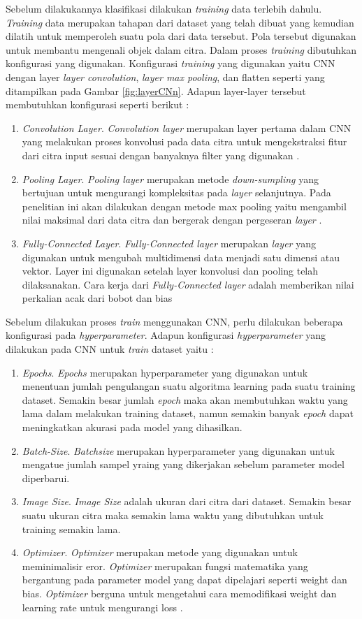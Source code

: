 Sebelum dilakukannya klasifikasi dilakukan \emph{training} data terlebih dahulu. \emph{Training} data merupakan tahapan dari dataset yang telah dibuat yang kemudian dilatih untuk memperoleh suatu pola dari data tersebut. Pola tersebut digunakan untuk membantu mengenali objek dalam citra. Dalam proses \emph{training} dibutuhkan konfigurasi yang digunakan. Konfigurasi \emph{training} yang digunakan yaitu CNN dengan layer \emph{layer convolution}, \emph{layer max pooling},  dan flatten seperti yang ditampilkan pada Gambar \ref*{fig:layerCNn}. Adapun layer-layer tersebut membutuhkan konfigurasi seperti berikut :
\begin{enumerate}
  \item \emph{Convolution Layer}. \emph{Convolution layer} merupakan layer pertama dalam CNN yang melakukan proses konvolusi pada data citra untuk mengekstraksi fitur dari citra input sesuai dengan banyaknya filter yang digunakan \parencite{konvolusilayer}. 
  \item \emph{Pooling Layer}. \emph{Pooling layer} merupakan metode \emph{down-sumpling} yang bertujuan untuk mengurangi kompleksitas pada \emph{layer} selanjutnya. Pada penelitian ini akan dilakukan dengan metode max pooling yaitu mengambil nilai maksimal dari data citra dan bergerak dengan pergeseran \emph{layer} \parencite{poolilayer}.
  \item \emph{Fully-Connected Layer}. \emph{Fully-Connected layer} merupakan \emph{layer} yang digunakan untuk mengubah multidimensi data menjadi satu dimensi atau vektor. Layer ini digunakan setelah layer konvolusi dan pooling telah dilaksanakan. Cara kerja dari \emph{Fully-Connected layer} adalah memberikan nilai perkalian acak dari bobot dan bias \parencite{flayenlayer}
\end{enumerate}
Sebelum dilakukan proses \emph{train} menggunakan CNN, perlu dilakukan beberapa konfigurasi pada \emph{hyperparameter}. Adapun konfigurasi \emph{hyperparameter} yang dilakukan pada CNN untuk \emph{train} dataset yaitu :
\begin{enumerate}
  \item \emph{Epochs}. \emph{Epochs} merupakan hyperparameter yang digunakan untuk menentuan jumlah pengulangan suatu algoritma learning pada suatu training dataset. Semakin besar jumlah \emph{epoch} maka akan membutuhkan waktu yang lama dalam melakukan training dataset, namun semakin banyak \emph{epoch} dapat meningkatkan akurasi pada model yang dihasilkan.
  \item \emph{Batch-Size}. \emph{Batchsize} merupakan hyperparameter yang digunakan untuk mengatue jumlah sampel yraing yang dikerjakan sebelum parameter model diperbarui.
  \item \emph{Image Size}. \emph{Image Size} adalah ukuran dari citra dari dataset. Semakin besar suatu ukuran citra maka semakin lama waktu yang dibutuhkan untuk training semakin lama.
  \item \emph{Optimizer}. \emph{Optimizer} merupakan metode yang digunakan untuk meminimalisir eror. \emph{Optimizer} merupakan fungsi matematika yang bergantung pada parameter model yang dapat dipelajari seperti weight dan bias. \emph{Optimizer} berguna untuk mengetahui cara memodifikasi weight dan learning rate untuk mengurangi loss \parencite{optimizer}.
\end{enumerate} 

